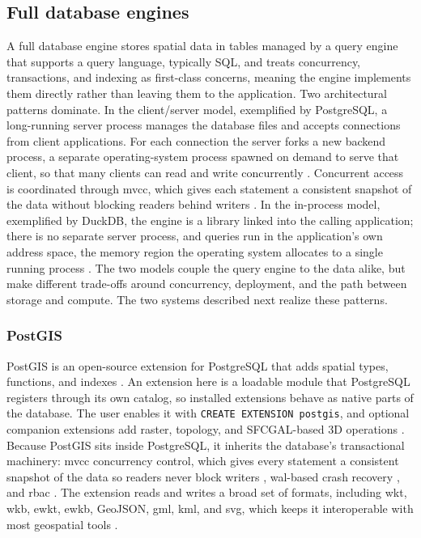 \subsection{Full database engines}
\label{background:spatial-data-formats-and-storage-models:full-database-engines}
A full database engine stores spatial data in tables managed by a query engine that supports a query language, typically SQL, and treats concurrency, transactions, and indexing as first-class concerns, meaning the engine implements them directly rather than leaving them to the application. Two architectural patterns dominate. In the client/server model, exemplified by PostgreSQL, a long-running server process manages the database files and accepts connections from client applications. For each connection the server forks a new backend process, a separate operating-system process spawned on demand to serve that client, so that many clients can read and write concurrently \parencite{postgresql2024_architectural_fundamentals}. Concurrent access is coordinated through \acrfull{mvcc}, which gives each statement a consistent snapshot of the data without blocking readers behind writers \parencite{postgresql2024_concurrency_control}. In the in-process model, exemplified by DuckDB, the engine is a library linked into the calling application; there is no separate server process, and queries run in the application's own address space, the memory region the operating system allocates to a single running process \parencite{raasveldt2019_duckdb_embeddable_analytical_database}. The two models couple the query engine to the data alike, but make different trade-offs around concurrency, deployment, and the path between storage and compute. The two systems described next realize these patterns.

\subsubsection{PostGIS}
\label{background:spatial-data-formats-and-storage-models:full-database-engines:postgis}
PostGIS is an open-source extension for PostgreSQL that adds spatial types, functions, and indexes \parencite{postgis2024_manual_34}. An extension here is a loadable module that PostgreSQL registers through its own catalog, so installed extensions behave as native parts of the database. The user enables it with \texttt{CREATE EXTENSION postgis}, and optional companion extensions add raster, topology, and SFCGAL-based 3D operations \parencite{postgis2024_manual_34}. Because PostGIS sits inside PostgreSQL, it inherits the database's transactional machinery: \acrshort{mvcc} concurrency control, which gives every statement a consistent snapshot of the data so readers never block writers \parencite{postgresql2024_concurrency_control}, \acrshort{wal}-based crash recovery \parencite{postgresql2024_wal}, and \acrfull{rbac} \parencite{postgresql2024_roles}. The extension reads and writes a broad set of formats, including \acrshort{wkt}, \acrshort{wkb}, \acrshort{ewkt}, \acrshort{ewkb}, GeoJSON, \acrshort{gml}, \acrfull{kml}, and \acrfull{svg}, which keeps it interoperable with most geospatial tools \parencite{postgis2024_manual_34}.

